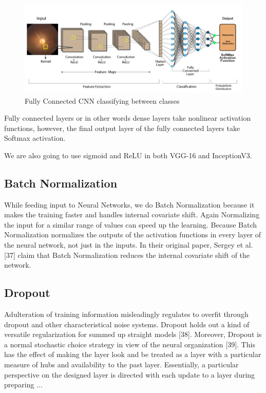 \vspace{5mm}
\begin{figure}[hbt!]
\centering
\includegraphics[scale=0.5]{images/Fully Connected CNN classifying between classes.png}
\caption{Fully Connected CNN classifying between classes}
\label{fig:x Fully Connected CNN classifying between classes}
\end{figure}

Fully connected layers or in other words dense layers take nonlinear activation functions, however, the final output layer of the fully connected layers take Softmax activation.

\vspace{5mm}
We are also going to use sigmoid and ReLU in both VGG-16 and InceptionV3.

\vspace{5mm}
\subsection{Batch Normalization}

\vspace{5mm}
While feeding input to Neural Networks, we do Batch Normalization because it makes the training faster and handles internal covariate shift. Again Normalizing the input for a similar range of values can speed up the learning. Because Batch Normalization normalizes the outputs of the activation functions in every layer of the neural network, not just in the inputs. In their original paper, Sergey et al. [37] claim that Batch Normalization reduces the internal covariate shift of the network.

\vspace{5mm}
\subsection{Dropout}

\vspace{5mm}
Adulteration of training information misleadingly regulates to overfit through dropout and other characteristical noise systems. Dropout holds out a kind of versatile regularization for summed up straight models [38]. Moreover, Dropout is a normal stochastic choice strategy in view of the neural organization [39]. This has the effect of making the layer look and be treated as a layer with a particular measure of hubs and availability to the past layer. Essentially, a particular perspective on the designed layer is directed with each update to a layer during preparing ...

